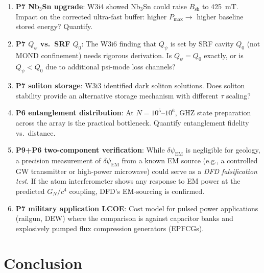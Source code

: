 \documentclass[11pt]{article}
\theoremstyle{definition}
\theoremstyle{remark}
\newcommand{\Qpsi}{Q_\psi}
\newcommand{\Pmax}{P_{\mathrm{max}}}
\newcommand{\dpsiem}{\delta\psi_{\mathrm{EM}}}
\newcommand{\GN}{G_N}
\begin{document}
\begin{enumerate}
\item \textbf{P7 Nb$_3$Sn upgrade}: W3i4 showed Nb$_3$Sn could raise
  $B_{\mathrm{sh}}$ to 425~mT. Impact on the corrected ultra-fast buffer:
  higher $\Pmax \to$ higher baseline stored energy? Quantify.

\item \textbf{P7 $\Qpsi$ vs.\ SRF $Q_0$}: The W3i6 finding that $\Qpsi$
  is set by SRF cavity $Q_0$ (not MOND confinement) needs rigorous
  derivation. Is $\Qpsi = Q_0$ exactly, or is $\Qpsi < Q_0$ due to
  additional psi-mode loss channels?

\item \textbf{P7 soliton storage}: W3i3 identified dark soliton solutions.
  Does soliton stability provide an alternative storage mechanism with
  different $\tau$ scaling?

\item \textbf{P6 entanglement distribution}: At $N = 10^5$--$10^6$,
  GHZ state preparation across the array is the practical bottleneck.
  Quantify entanglement fidelity vs.\ distance.

\item \textbf{P9+P6 two-component verification}: While $\dpsiem$ is
  negligible for geology, a precision measurement of $\dpsiem$ from a
  known EM source (e.g., a controlled GW transmitter or high-power
  microwave) could serve as a \emph{DFD falsification test}. If the
  atom interferometer shows any response to EM power at the predicted
  $\GN/c^4$ coupling, DFD's EM-sourcing is confirmed.

\item \textbf{P7 military application LCOE}: Cost model for pulsed power
  applications (railgun, DEW) where the comparison is against capacitor
  banks and explosively pumped flux compression generators (EPFCGs).
\end{enumerate}

\section{Conclusion}
\label{sec:conclusion}
\end{document}

